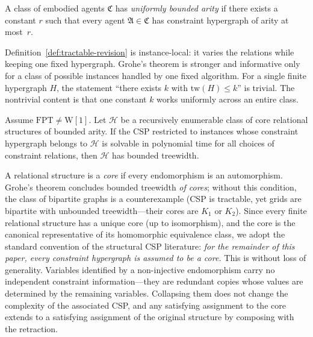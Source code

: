 \documentclass[runningheads]{llncs}
\begin{document}
\begin{definition}\label{def:class-bounded-arity}
A class of embodied agents $\mathfrak{C}$ has \emph{uniformly bounded arity} if there exists a constant $r$ such that every agent $\mathfrak{A} \in \mathfrak{C}$ has constraint hypergraph of arity at most~$r$.
\end{definition}

\begin{remark}\label{rem:grohe-class}
Definition~\ref{def:tractable-revision} is instance-local: it varies the relations while keeping one fixed hypergraph. Grohe's theorem is stronger and informative only for a class of possible instances handled by one fixed algorithm. For a single finite hypergraph $H$, the statement ``there exists $k$ with $\mathrm{tw}(H) \leq k$'' is trivial. The nontrivial content is that one constant $k$ works uniformly across an entire class.
\end{remark}

\begin{theorem}\label{thm:grohe}
Assume $\mathrm{FPT} \neq \mathrm{W}[1]$.
Let $\mathcal{H}$ be a recursively enumerable class of core relational structures of bounded arity.
If the CSP restricted to instances whose constraint hypergraph belongs to $\mathcal{H}$ is solvable in polynomial time for all choices of constraint relations, then $\mathcal{H}$ has bounded treewidth.
\end{theorem}

\begin{remark}\label{rem:core}
A relational structure is a \emph{core} if every endomorphism is an automorphism.
Grohe's theorem concludes bounded treewidth \emph{of cores}; without this condition, the class of bipartite graphs is a counterexample (CSP is tractable, yet grids are bipartite with unbounded treewidth---their cores are $K_1$ or $K_2$).
Since every finite relational structure has a unique core (up to isomorphism), and the core is the canonical representative of its homomorphic equivalence class, we adopt the standard convention of the structural CSP literature: \emph{for the remainder of this paper, every constraint hypergraph is assumed to be a core.}
This is without loss of generality.
Variables identified by a non-injective endomorphism carry no independent constraint information---they are redundant copies whose values are determined by the remaining variables.
Collapsing them does not change the complexity of the associated CSP, and any satisfying assignment to the core extends to a satisfying assignment of the original structure by composing with the retraction.
\end{remark}
\end{document}
